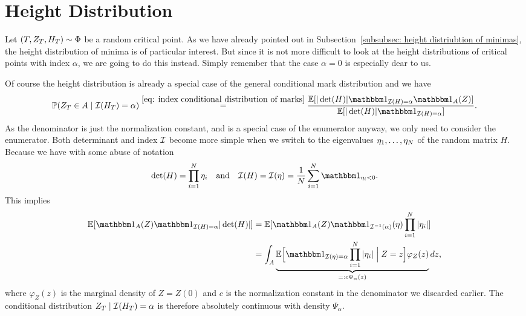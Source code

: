 \section{Height Distribution}
\label{sec: height distribution}

Let \((T,Z_T,H_T)\sim\Phi\) be a random critical point. As we have
already pointed out in Subsection~\ref{subsubsec: height distriubtion of minimas},
the height distribution of minima is of particular interest. But since it is
not more difficult to look at the height distributions of critical points with
index \(\alpha\), we are going to do this instead. Simply remember that the
case \(\alpha=0\) is especially dear to us.

Of course the height distribution is already a special case of the general
conditional mark distribution and we have
\[
	\Pr(\rf_T \in A \mid \negEV(H_T) = \alpha)
	\overset{\eqref{eq: index conditional distribution of marks}}=
	\frac{
		\E[|\det(H)|\ind_{\negEV(H)=\alpha}\ind_A(Z)]
	}{
		\E[|\det(H)|\ind_{\negEV(H)=\alpha}]
	}.
\]
As the denominator is just the normalization constant, and is a special case
of the enumerator anyway, we only need to consider the enumerator.
Both determinant and index \(\mathcal{I}\) become more simple when we
switch to the eigenvalues \(\eta_1,\dots,\eta_N\) of the random matrix
\(H\). Because we have
with some abuse of notation
\[
	\det(H) = \prod_{i=1}^\dims \evH_i
	\quad\text{and}\quad
	\negEV(H) = \negEV(\evH)
	= \frac1\dims \sum_{i=1}^\dims \ind_{\evH_i < 0}.
\]
This implies
\[\begin{aligned}
	\E[\ind_{A}(Z)\ind_{\negEV(H) = \alpha}|\det(H)|]
	&= \E[\ind_{A}(Z)
	\ind_{\negEV^{-1}(\alpha)}(\evH)\prod_{i=1}^\dims |\evH_i|]\\
	&= \int_A \underbrace{
		\E\Big[
			\ind_{\negEV(\evH) = \alpha}\prod_{i=1}^\dims |\evH_i|
			\Bigm| Z=z
		\Big]
		\varphi_Z(z)
	}_{=:c\Psi_\alpha(z)}
	dz,
\end{aligned}\]
where \(\varphi_Z(z)\) is the marginal density of \(Z=Z(0)\) and \(c\) is the
normalization constant in the denominator we discarded earlier.
The conditional distribution \(Z_T \mid \mathcal{I}(H_T) = \alpha\) is therefore
absolutely continuous with density \(\Psi_\alpha\).

